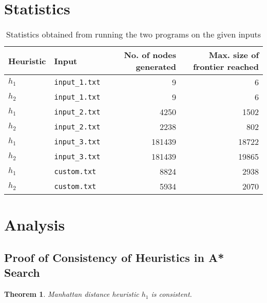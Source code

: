 \documentclass[10pt, a4paper]{article}
\newtheorem{theorem}{Theorem}
\theoremstyle{definition}
\begin{document}
\section{Statistics}
\begin{table}[!htb]
  \caption{Statistics obtained from running the two programs on the given inputs}
  \label{tab:stats}
  \centering
  \begin{tabular}{l|l|r|r}
    \textbf{Heuristic} & \textbf{Input}        & \textbf{No. of nodes generated} & \textbf{Max. size of frontier reached} \\ \hline
    $h_1$              & \texttt{input\_1.txt} & 9                               & 6                                      \\
    $h_2$              & \texttt{input\_1.txt} & 9                               & 6                                      \\ \hline
    $h_1$              & \texttt{input\_2.txt} & 4250                            & 1502                                   \\
    $h_2$              & \texttt{input\_2.txt} & 2238                            & 802                                    \\ \hline
    $h_1$              & \texttt{input\_3.txt} & 181439                          & 18722                                  \\
    $h_2$              & \texttt{input\_3.txt} & 181439                          & 19865                                  \\ \hline
    $h_1$              & \texttt{custom.txt}   & 8824                            & 2938                                   \\
    $h_2$              & \texttt{custom.txt}   & 5934                            & 2070
  \end{tabular}
\end{table}

\section{Analysis}
\subsection{Proof of Consistency of Heuristics in A* Search}
\begin{theorem}
  Manhattan distance heuristic $h_1$ is consistent.
\end{theorem}
\end{document}
